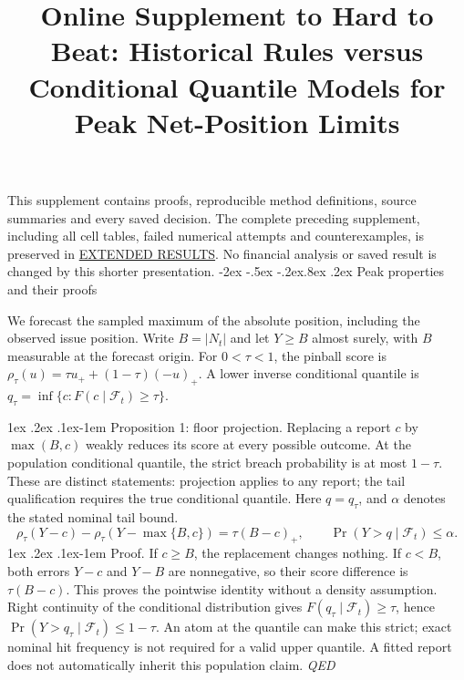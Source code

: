 \documentclass[10pt,a4paper]{article}
\title{Online Supplement to Hard to Beat: Historical Rules versus Conditional Quantile Models for Peak Net-Position Limits}
\author{}
\date{}
\makeatletter
\renewcommand\section{\@startsection{section}{1}{\z@}%
  {-2ex \@plus -.5ex \@minus -.2ex}{.8ex \@plus .2ex}%
  {\normalfont\large\bfseries}}
\renewcommand\paragraph{\@startsection{paragraph}{4}{\z@}%
  {1ex \@plus .2ex \@minus .1ex}{-1em}%
  {\normalfont\normalsize\bfseries}}
\makeatother
\begin{document}
\maketitle
This supplement contains proofs, reproducible method definitions, source summaries and every saved decision. The complete preceding supplement, including all cell tables, failed numerical attempts and counterexamples, is preserved in \href{https://github.com/ByronLi0207/financial-mathematics-paper-20261020/blob/submission-final/EXTENDED_RESULTS.md}{EXTENDED RESULTS}. No financial analysis or saved result is changed by this shorter presentation.
\setcounter{tocdepth}{1}
\tableofcontents
\medskip
\section{Peak properties and their proofs}\label{sup:floor}\label{sup:levy}

We forecast the sampled maximum of the absolute position, including
the observed issue position. Write \(B=|N_t|\) and let \(Y\ge B\) almost surely,
with \(B\) measurable at the forecast origin. For \(0<\tau<1\), the pinball score is
\(\rho_\tau(u)=\tau u_+ +(1-\tau)(-u)_+\). A lower inverse conditional quantile
is \(q_\tau=\inf\{c:F(c\mid\mathcal F_t)\ge\tau\}\).

\paragraph{Proposition 1: floor projection.}
Replacing a report \(c\) by \(\max(B,c)\) weakly reduces its score at every possible
outcome. At the population conditional quantile, the strict breach probability
is at most \(1-\tau\). These are distinct statements: projection applies to any
report; the tail qualification requires the true conditional quantile.
Here \(q=q_\tau\), and \(\alpha\) denotes the stated nominal tail bound.
\[
\rho_\tau(Y-c)-\rho_\tau(Y-\max\{B,c\})=\tau(B-c)_+,\qquad \Pr(Y>q\mid\mathcal F_t)\le\alpha.
\]
\paragraph{Proof.}
If \(c\ge B\), the replacement changes nothing. If \(c<B\), both errors
\(Y-c\) and \(Y-B\) are nonnegative, so their score difference is
\(\tau(B-c)\). This proves the pointwise identity without a density assumption.
Right continuity of the conditional distribution gives
\(F(q_\tau\mid\mathcal F_t)\ge\tau\), hence
\(\Pr(Y>q_\tau\mid\mathcal F_t)\le1-\tau\). An atom at the quantile can make
this strict; exact nominal hit frequency is not required for a valid upper
quantile. A fitted report does not automatically inherit this population claim.
\hfill\textit{QED}
\end{document}
